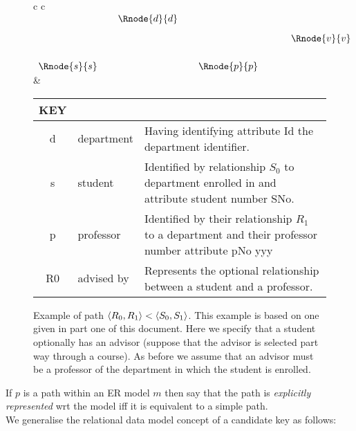 \documentclass[10pt,a4paper]{article}
\newcommand{\genericmodel}{\mathcal{M}}
\renewcommand{\genericmodel}{{m}}
\newcommand{\term}[1]{\textit{{#1}}}
\begin{document}
\begin{figure} [H]  %
\begin{center}
\begin{tabular}{c c}
$
\begin{array}{cp{0.05cm}c  p{0.05cm}c p{0.5cm}c}
                & & \Rnode{d}{d} & &              & &             \\ [0.3cm]
								& &              & &              & & \Rnode{v}{v} \\ [0.6cm]     
	 \Rnode{s}{s} & &              & & \Rnode{p}{p} & &             
\end{array}
$
\idcomp
{} 
\idcomp
{} 
\idcomp
{} 
\idcomp
{} 
\idcomp
& \footnotesize
\begin{tabular}{c p{1.5cm} p{4cm}}
KEY && \\
\hline
d & department & Having identifying attribute Id the department identifier. \\
s & student & Identified by relationship $S_0$ to department enrolled in and  attribute student number SNo. \\
p & professor & Identified by their relationship $R_1$ to a department and their professor number attribute pNo yyy \\
R0 & advised by & Represents the optional relationship between a student and a professor.\\
\end{tabular} 
\end{tabular}
\end{center}
\caption{Example of path  $\langle R_0,R_1\rangle < \langle S_0,S_1\rangle$. This example is based on one given in part one of this document. Here we specify that a student optionally has an advisor (suppose that the advisor is selected part way through a course). As before we assume that an advisor must be a professor of the department in which the student is enrolled. }
\label{studentadvisorgraph}
\end{figure}


 
\noindent If $p$ is a path within an ER model $\genericmodel$ then say that the path is \term{explicitly represented} wrt the model iff it is equivalent to a simple path. \\

\noindent We generalise the relational data model concept of a candidate key as follows:
\end{document}
